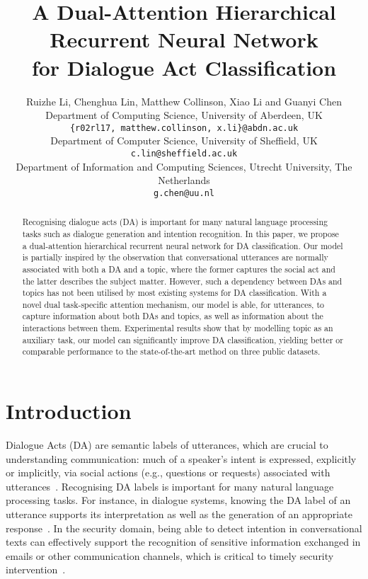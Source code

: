 \documentclass[11pt,a4paper]{article}
\title{A Dual-Attention Hierarchical Recurrent Neural Network\\ for Dialogue Act Classification}
\author{Ruizhe Li\textsuperscript{}, Chenghua Lin\textsuperscript{}, Matthew Collinson\textsuperscript{}, Xiao Li\textsuperscript{} and Guanyi Chen\textsuperscript{}\\
\textsuperscript{}Department of Computing Science, University of Aberdeen, UK\\
\texttt{\{r02rl17, matthew.collinson, x.li\}@abdn.ac.uk}\\
\textsuperscript{}Department of Computer Science, University of Sheffield, UK\\
\texttt{c.lin@sheffield.ac.uk}\\
\textsuperscript{}Department of Information and Computing Sciences, Utrecht University, The Netherlands \\ 
\texttt{g.chen@uu.nl}}
\date{}
\begin{document}
\maketitle
\begin{abstract}
Recognising dialogue acts (DA) is important for many natural language processing tasks such as dialogue generation and intention recognition. In this paper, we propose a dual-attention hierarchical recurrent neural network for DA classification. Our model is partially inspired by the observation that conversational utterances are normally associated with both a DA and a topic, where the former captures the social act and the latter describes the subject matter. However, such a dependency between DAs and topics has not been utilised by most existing systems for DA classification. With a novel dual task-specific attention mechanism, our model is able, for utterances, to capture information about both DAs and topics, as well as information about the interactions between them. Experimental results show that by modelling topic as an auxiliary task, our model can significantly improve DA classification, yielding better or comparable performance to the state-of-the-art method on three public datasets.

\end{abstract}

\section{Introduction}
Dialogue Acts (DA) are semantic labels of utterances, which are
crucial to understanding communication: much of a speaker's intent is expressed, explicitly or implicitly, via social actions (e.g., questions or requests) associated with utterances~\cite{searle1969speech}.
Recognising DA labels is important for many natural language processing tasks. For instance, in dialogue systems, knowing the DA label of an utterance supports its interpretation as well as the generation of an appropriate response~\cite{searle1969speech,chen2018dialogue}. 
In the security domain, being able to detect intention in conversational texts can effectively support the recognition of sensitive information exchanged in emails or other communication channels, which is critical to timely security intervention~\cite{verma2012detecting}.
\end{document}
